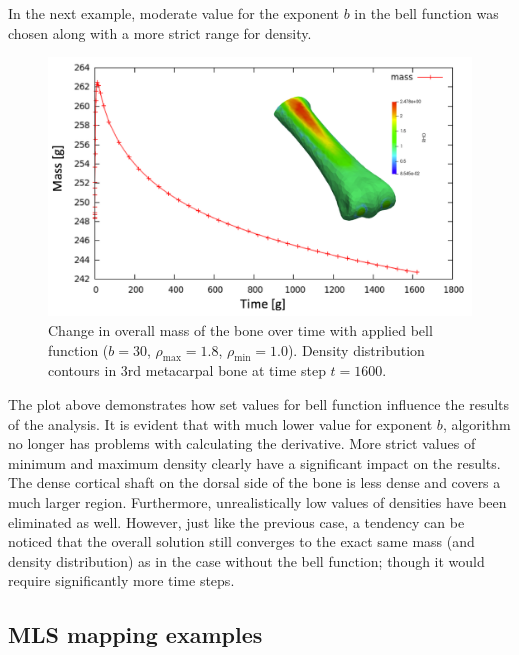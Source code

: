 \documentclass[11pt]{acmeArticle}
\numberwithin{equation}{section}
\begin{document}
In the next example, moderate value for the exponent $b$ in the bell function was chosen along with a more strict range for density.
\begin{figure}[h!]
	\begin{centering}
		\includegraphics[width=15cm]{Figures/graphs/density_bell2.png}
		\caption{Change in overall mass of the bone over time with applied bell function ($b = 30$, $\rho_\mathrm{max} = 1.8$, $\rho_\mathrm{min} = 1.0$). Density distribution contours in 3rd metacarpal bone at time step $t=1600$.}
		\label{fig:density_bell2}
	\end{centering}
\end{figure}
The plot above demonstrates how set values for bell function influence the results of the analysis. It is evident that with much lower value for exponent $b$, algorithm no longer has problems with calculating the derivative. More strict values of minimum and maximum density clearly have a significant impact on the results. The dense cortical shaft on the dorsal side of the bone is less dense and covers a much larger region. Furthermore, unrealistically low values of densities have been eliminated as well. However, just like the previous case, a tendency can be noticed that the overall solution still converges to the exact same mass (and density distribution) as in the case without the bell function; though it would require significantly more time steps. \\
\subsection{MLS mapping examples}
\end{document}
